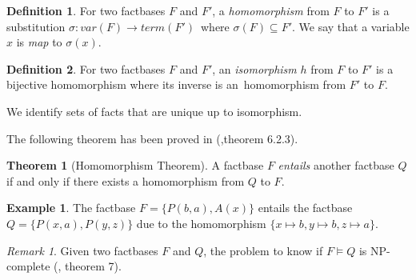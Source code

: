 \documentclass{article}
\theoremstyle{definition}
\newtheorem{definition}{Definition}[section]
\newtheorem{theorem}{Theorem}[section]
\newtheorem{example}{Example}[section]
\theoremstyle{remark}
\newtheorem{remark}{Remark}[section]
\begin{document}
\begin{definition}
For two factbases $F$ and $F'$, a \emph{homomorphism} from $F$ to $F'$ is a substitution $\sigma:var(F) \to term(F')$\ where $\sigma(F) \subseteq F'$. We say that a variable $x$ is \emph{map} to $\sigma(x)$.
\end{definition}

\begin{definition}
For two factbases $F$ and $F'$, an \emph{isomorphism} $h$ from $F$ to $F'$ is a bijective homomorphism where its inverse is an\ homomorphism from $F'$ to $F$.
\end{definition}

We identify sets of facts that are unique up to isomorphism.


The following theorem has been proved in (\cite{base},theorem 6.2.3).

\begin{theorem}[Homomorphism Theorem] \label{hom_thm}
A factbase $F$ \emph{entails} another factbase $Q$ if and only if there exists a homomorphism from $Q$ to $F$.
\end{theorem}

\begin{example}
The factbase $F = \{P(b,a),A(x)\}$ entails the factbase $Q = \{P(x,a),P(y,z)\}$ due to the homomorphism $\{x \mapsto b, y \mapsto b, z \mapsto a \}$.
\end{example}

\begin{remark}
Given two factbases $F$ and $Q$, the problem to know if $F \models Q$ is NP-complete (\cite{NP}, theorem 7).
\end{remark}
\end{document}
